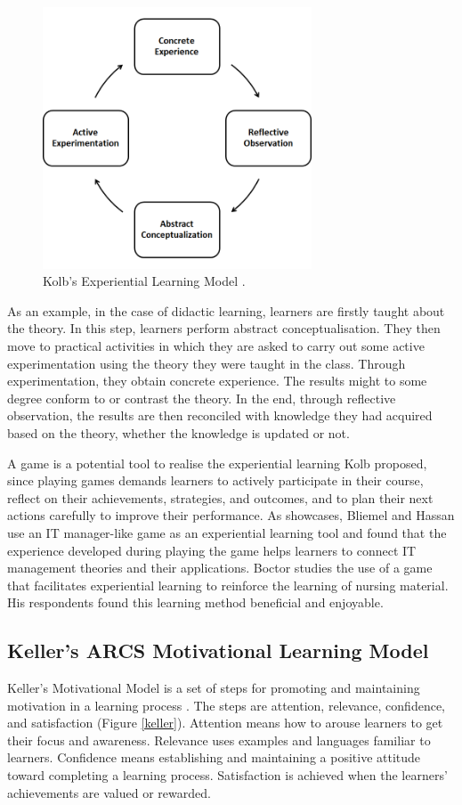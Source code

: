 \documentclass[12pt, a4paper]{report}
\begin{document}
\begin{figure}[ht]
\centering
\includegraphics[width=8cm]{kolb}
\caption{Kolb's Experiential Learning Model \cite{kolb2014experiential}.}
\label{kolb}
\end{figure}

As an example, in the case of didactic learning, learners are firstly taught about the theory. In this step, learners perform abstract conceptualisation. They then move to practical activities in which they are asked to carry out some active experimentation using the theory they were taught in the class. Through experimentation, they obtain concrete experience. The results might to some degree conform to or contrast the theory. In the end, through reflective observation, the results are then reconciled with knowledge they had acquired based on the theory, whether the knowledge is updated or not. 

A game is a potential tool to realise the experiential learning Kolb proposed, since playing games demands learners to actively participate in their course, reflect on their achievements, strategies, and outcomes, and to plan their next actions carefully to improve their performance. As showcases, Bliemel and Hassan \cite{bliemel2014game} use an IT manager-like game as an experiential learning tool and found that the experience developed during playing the game helps learners to connect IT management theories and their applications. Boctor \cite{boctor2013active} studies the use of a game that facilitates experiential learning to reinforce the learning of nursing material. His respondents found this learning method beneficial and enjoyable. 
 
\subsection{Keller's ARCS Motivational Learning Model}
Keller's Motivational Model is a set of steps for promoting and maintaining motivation in a learning process \cite{keller2010motivational}. The steps are attention, relevance, confidence, and satisfaction (Figure \ref{keller}). Attention means how to arouse learners to get their focus and awareness. Relevance uses examples and languages familiar to learners. Confidence means establishing and maintaining a positive attitude toward completing a learning process. Satisfaction is achieved when the learners' achievements are valued or rewarded. 
\end{document}
